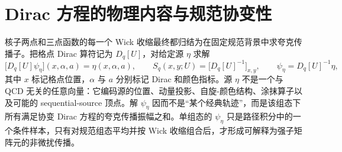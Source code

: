 \documentclass[UTF8,12pt,a4paper,twoside,openany]{ctexbook}
\begin{document}
\section{Dirac 方程的物理内容与规范协变性}

核子两点和三点函数的每一个 Wick 收缩最终都归结为在固定规范背景中求夸克传播子。把格点 Dirac 算符记为 \(D_q[U]\)，对给定源 \(\eta\) 求解
\begin{equation}
  \bigl[D_q[U]\psi_\eta\bigr](x,\alpha,a)=\eta(x,\alpha,a),
  \qquad
  S_q(x,y;U)=\bigl[D_q[U]^{-1}\bigr]_{x,y},
  \qquad
  \psi_\eta=D_q[U]^{-1}\eta ,
  \label{eq:diracsolve}
\end{equation}
其中 \(x\) 标记格点位置，\(\alpha\) 与 \(a\) 分别标记 Dirac 和颜色指标。源 \(\eta\) 不是一个与 QCD 无关的任意向量：它编码源的位置、动量投影、自旋-颜色结构、涂抹算子以及可能的 sequential-source 顶点。解 \(\psi_\eta\) 因而不是“某个经典轨迹”，而是该组态下所有满足协变 Dirac 方程的夸克传播振幅之和。单组态的 \(\psi_\eta\) 只是路径积分中的一个条件样本，只有对规范组态平均并按 Wick 收缩组合后，才形成可解释为强子矩阵元的非微扰传播。
\end{document}
